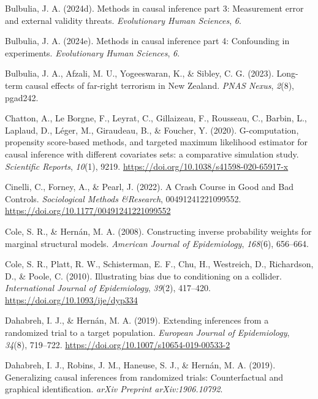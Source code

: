 \documentclass[
  single column]{article}
\newlength{\cslhangindent}
\newenvironment{CSLReferences}[2] %
 {\begin{list}{}{%
  \setlength{\itemindent}{0pt}
  \setlength{\leftmargin}{0pt}
  \setlength{\parsep}{0pt}
  \ifodd #1
   \setlength{\leftmargin}{\cslhangindent}
   \setlength{\itemindent}{-1\cslhangindent}
  \fi
  \setlength{\itemsep}{#2\baselineskip}}}
 {\end{list}}
\begin{document}
\begin{CSLReferences}{1}{0}
Bulbulia, J. A. (2024d). Methods in causal inference part 3: Measurement
error and external validity threats. \emph{Evolutionary Human Sciences},
\emph{6}.

Bulbulia, J. A. (2024e). Methods in causal inference part 4: Confounding
in experiments. \emph{Evolutionary Human Sciences}, \emph{6}.

Bulbulia, J. A., Afzali, M. U., Yogeeswaran, K., \& Sibley, C. G.
(2023). Long-term causal effects of far-right terrorism in {N}ew
{Z}ealand. \emph{PNAS Nexus}, \emph{2}(8), pgad242.

Chatton, A., Le Borgne, F., Leyrat, C., Gillaizeau, F., Rousseau, C.,
Barbin, L., Laplaud, D., Léger, M., Giraudeau, B., \& Foucher, Y.
(2020). G-computation, propensity score-based methods, and targeted
maximum likelihood estimator for causal inference with different
covariates sets: a comparative simulation study. \emph{Scientific
Reports}, \emph{10}(1), 9219.
\url{https://doi.org/10.1038/s41598-020-65917-x}

Cinelli, C., Forney, A., \& Pearl, J. (2022). A Crash Course in Good and
Bad Controls. \emph{Sociological Methods \&Research}, 00491241221099552.
\url{https://doi.org/10.1177/00491241221099552}

Cole, S. R., \& Hernán, M. A. (2008). Constructing inverse probability
weights for marginal structural models. \emph{American Journal of
Epidemiology}, \emph{168}(6), 656--664.

Cole, S. R., Platt, R. W., Schisterman, E. F., Chu, H., Westreich, D.,
Richardson, D., \& Poole, C. (2010). Illustrating bias due to
conditioning on a collider. \emph{International Journal of
Epidemiology}, \emph{39}(2), 417--420.
\url{https://doi.org/10.1093/ije/dyp334}

Dahabreh, I. J., \& Hernán, M. A. (2019). Extending inferences from a
randomized trial to a target population. \emph{European Journal of
Epidemiology}, \emph{34}(8), 719--722.
\url{https://doi.org/10.1007/s10654-019-00533-2}

Dahabreh, I. J., Robins, J. M., Haneuse, S. J., \& Hernán, M. A. (2019).
Generalizing causal inferences from randomized trials: Counterfactual
and graphical identification. \emph{arXiv Preprint arXiv:1906.10792}.


\end{CSLReferences}
\end{document}
